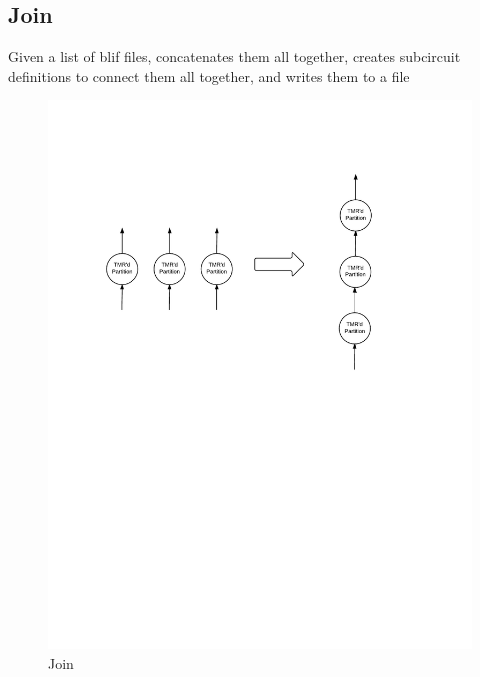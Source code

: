 \documentclass[12pt,final,oneside]{dwThesis} %
\begin{document}
   \newpage \subsection{Join}\label{algJoin} Given a list of blif files,
   concatenates them all together, creates subcircuit definitions to connect
   them all together, and writes them to a file \begin{figure} \begin{center}
         \includegraphics[width=\linewidth]{images/Join.pdf} \caption{Join}
         \label{imJoin} \end{center} \end{figure}
\end{document}

